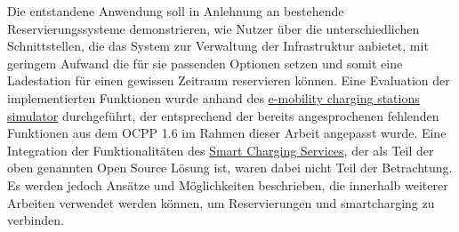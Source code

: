 Die entstandene Anwendung soll in Anlehnung an bestehende Reservierungssysteme demonstrieren, wie Nutzer \"uber die unterschiedlichen Schnittstellen, die das System zur Verwaltung der Infrastruktur anbietet, mit geringem Aufwand die f\"ur sie passenden Optionen setzen und somit eine Ladestation f\"ur einen gewissen Zeitraum reservieren k\"onnen.
Eine Evaluation der implementierten Funktionen wurde anhand des \href{https://github.com/SAP/e-mobility-charging-stations-simulator}{e-mobility charging stations simulator} durchgef\"uhrt, der entsprechend der bereits angesprochenen fehlenden Funktionen aus dem OCPP 1.6 im Rahmen dieser Arbeit angepasst wurde.
Eine Integration der Funktionalit\"aten des \href{https://github.com/sap-labs-france/emobility-smart-charging}{Smart Charging Services}, der als Teil der oben genannten Open Source L\"osung ist, waren dabei nicht Teil der Betrachtung. Es werden jedoch Ans\"atze und M\"oglichkeiten beschrieben, die innerhalb weiterer Arbeiten verwendet werden k\"onnen, um Reservierungen und \Gls{smartcharging} zu verbinden.
